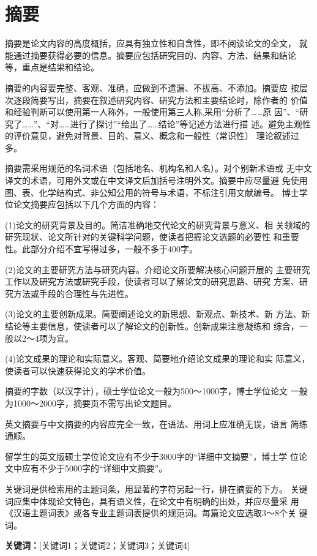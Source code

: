 \chapter*{摘要}
摘要是论文内容的高度概括，应具有独立性和自含性，即不阅读论文的全文，
就能通过摘要获得必要的信息。摘要应包括研究目的、内容、方法、结果和结论
等，重点是结果和结论。 

摘要的内容要完整、客观、准确，应做到不遗漏、不拔高、不添加。摘要应
按层次逐段简要写出，摘要在叙述研究内容、研究方法和主要结论时，除作者的
价值和经验判断可以使用第一人称外，一般使用第三人称,采用“分析了……原
因”、“研究了……”、“对……进行了探讨”“给出了……结论”等记述方法进行描
述。避免主观性的评价意见，避免对背景、目的、意义、概念和一般性（常识性）
理论叙述过多。 

摘要需采用规范的名词术语（包括地名、机构名和人名）。对个别新术语或
无中文译文的术语，可用外文或在中文译文后加括号注明外文。摘要中应尽量避
免使用图、表、化学结构式、非公知公用的符号与术语，不标注引用文献编号。 
博士学位论文摘要应包括以下几个方面的内容： 

(1)论文的研究背景及目的。简洁准确地交代论文的研究背景与意义、相
关领域的研究现状、论文所针对的关键科学问题，使读者把握论文选题的必要性
和重要性。此部分介绍不宜写得过多，一般不多于400字。 

(2)论文的主要研究方法与研究内容。介绍论文所要解决核心问题开展的
主要研究工作以及研究方法或研究手段，使读者可以了解论文的研究思路、研究
方案、研究方法或手段的合理性与先进性。 

(3)论文的主要创新成果。简要阐述论文的新思想、新观点、新技术、新
方法、新结论等主要信息，使读者可以了解论文的创新性。创新成果注意凝练和
综合，一般以2～4项为宜。 

(4)论文成果的理论和实际意义。客观、简要地介绍论文成果的理论和实
际意义，使读者可以快速获得论文的学术价值。 

摘要的字数（以汉字计），硕士学位论文一般为500～1000字，博士学位论文
一般为1000～2000字，摘要页不需写出论文题目。 

英文摘要与中文摘要的内容应完全一致，在语法、用词上应准确无误，语言
简练通顺。 

留学生的英文版硕士学位论文应有不少于3000字的“详细中文摘要”，博士学
位论文中应有不少于5000字的“详细中文摘要”。 

关键词是供检索用的主题词条，用显著的字符另起一行，排在摘要的下方。
关键词应集中体现论文特色，具有语义性，在论文中有明确的出处，并应尽量采
用《汉语主题词表》或各专业主题词表提供的规范词。每篇论文应选取3～8个关
键词。

{\bfseries 关键词：}[关键词1；关键词2；关键词3；关键词4] 




